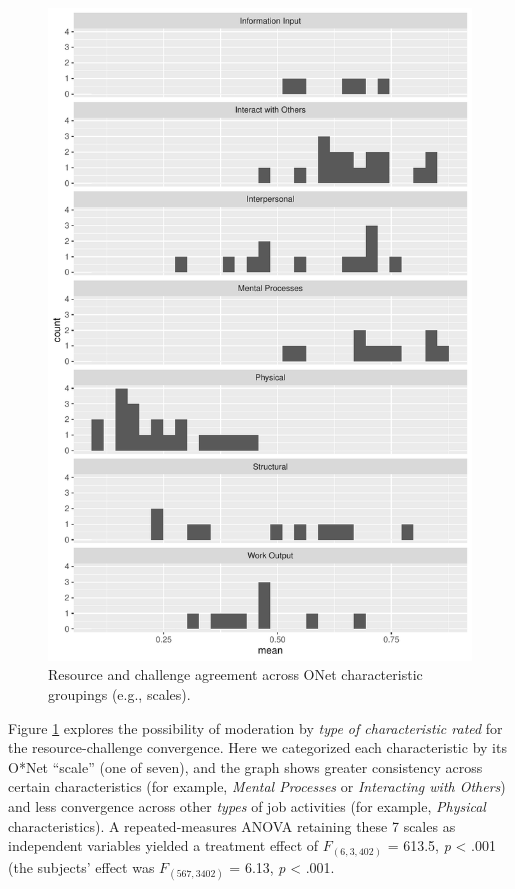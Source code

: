 \documentclass[
  man]{apa6}
\begin{document}
\begin{figure}
\centering
\includegraphics{convergence_files/figure-latex/recchall-1.pdf}
\caption{\label{fig:recchall}Resource and challenge agreement across ONet characteristic groupings (e.g., scales).}
\end{figure}

Figure \ref{fig:recchall} explores the possibility of moderation by \emph{type of characteristic rated} for the resource-challenge convergence. Here we categorized each characteristic by its O*Net ``scale'' (one of seven), and the graph shows greater consistency across certain characteristics (for example, \emph{Mental Processes} or \emph{Interacting with Others}) and less convergence across other \emph{types} of job activities (for example, \emph{Physical} characteristics). A repeated-measures ANOVA retaining these 7 scales as independent variables yielded a treatment effect of \(F_(6, 3,402)\) = 613.5, \emph{p} \textless{} .001 (the subjects' effect was \(F_{(567, 3402)}\) = 6.13, \emph{p} \textless{} .001.
\end{document}
